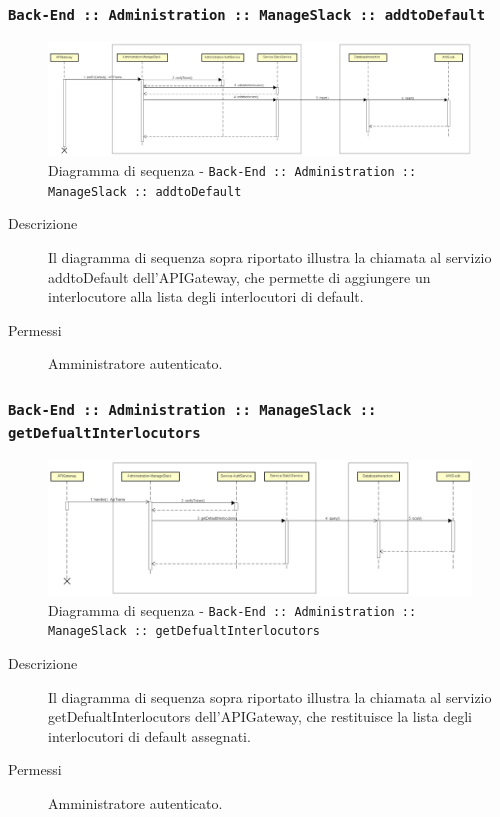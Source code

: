 \documentclass[../DefinizioneDiProdotto_v2.0.0.tex]{subfiles}
\begin{document}
\newpage
\subsubsection{\texttt{Back-End :: Administration :: ManageSlack :: addtoDefault}}
\begin{figure}[!h]
	\centering
	\includegraphics[scale=0.3]{DiagrammiSequenza/Back-End/manageSlack/addtoDefault.png}
	\caption{Diagramma di sequenza - \texttt{Back-End :: Administration :: ManageSlack :: addtoDefault }}
\end{figure}
\begin{description}
	\item [Descrizione] Il diagramma di sequenza sopra riportato illustra la chiamata al servizio addtoDefault dell'APIGateway, che permette di aggiungere un interlocutore alla lista degli interlocutori di default.
	\item [Permessi] Amministratore autenticato.
\end{description}

\subsubsection{\texttt{Back-End :: Administration :: ManageSlack :: getDefualtInterlocutors}}
\begin{figure}[!h]
	\centering
	\includegraphics[scale=0.3]{DiagrammiSequenza/Back-End/manageSlack/getDefaultInterlocutors.png}
	\caption{Diagramma di sequenza - \texttt{Back-End :: Administration :: ManageSlack :: getDefualtInterlocutors}}
\end{figure}
\begin{description}
	\item [Descrizione] Il diagramma di sequenza sopra riportato illustra la chiamata al servizio getDefualtInterlocutors dell'APIGateway, che restituisce la lista degli interlocutori di default assegnati.
	\item [Permessi] Amministratore autenticato.
\end{description}
\end{document}
